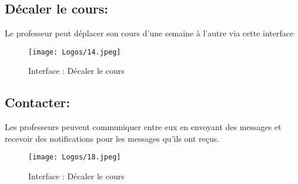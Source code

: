 \subsection*{Décaler le cours:}
Le professeur peut déplacer son cours d'une semaine à l'autre via cette interface\\
\begin{figure}[H]
      \centering
        \texttt{[image: Logos/14.jpeg]}
        \caption{Interface : Décaler le cours}
\end{figure}
\newpage
\subsection*{Contacter:}
Les professeurs peuvent communiquer entre eux en envoyant des messages et recevoir des notifications pour les messages qu'ils ont reçus.\\
\begin{figure}[H]
      \centering
        \texttt{[image: Logos/18.jpeg]}
        \caption{Interface : Décaler le cours}
\end{figure}
\newpage
